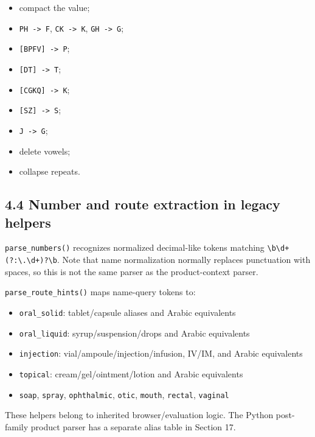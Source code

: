 \begin{itemize}
\tightlist
\item
  compact the value;
\item
  \texttt{PH\ -\textgreater{}\ F}, \texttt{CK\ -\textgreater{}\ K}, \texttt{GH\ -\textgreater{}\ G};
\item
  \texttt{{[}BPFV{]}\ -\textgreater{}\ P};
\item
  \texttt{{[}DT{]}\ -\textgreater{}\ T};
\item
  \texttt{{[}CGKQ{]}\ -\textgreater{}\ K};
\item
  \texttt{{[}SZ{]}\ -\textgreater{}\ S};
\item
  \texttt{J\ -\textgreater{}\ G};
\item
  delete vowels;
\item
  collapse repeats.
\end{itemize}

\subsection{4.4 Number and route extraction in legacy helpers}\label{44-number-and-route-extraction-in-legacy-helpers}

\texttt{parse\_\allowbreak{}numbers()} recognizes normalized decimal-like tokens matching \texttt{\textbackslash{}b\textbackslash{}d+(?:\textbackslash{}.\textbackslash{}d+)?\textbackslash{}b}. Note that name normalization normally replaces punctuation with spaces, so this is not the same parser as the product-context parser.

\texttt{parse\_\allowbreak{}route\_\allowbreak{}hints()} maps name-query tokens to:

\begin{itemize}
\tightlist
\item
  \texttt{oral\_\allowbreak{}solid}: tablet/capsule aliases and Arabic equivalents
\item
  \texttt{oral\_\allowbreak{}liquid}: syrup/suspension/drops and Arabic equivalents
\item
  \texttt{injection}: vial/ampoule/injection/infusion, IV/IM, and Arabic equivalents
\item
  \texttt{topical}: cream/gel/ointment/lotion and Arabic equivalents
\item
  \texttt{soap}, \texttt{spray}, \texttt{ophthalmic}, \texttt{otic}, \texttt{mouth}, \texttt{rectal}, \texttt{vaginal}
\end{itemize}

These helpers belong to inherited browser/evaluation logic. The Python post-family product parser has a separate alias table in Section 17.

